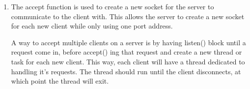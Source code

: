 \documentclass{article}
\begin{document}
\begin{enumerate}
      \item The accept function is used to create a new socket for the server to communicate to the client with. This allows the server to create a new socket for each new client while only using one port address.

            A way to accept multiple clients on a server is by having listen() block until a request come in, before accept() ing that request and create a new thread or task for each new client. This way, each client will have a thread dedicated to handling it's requests. The thread should run until the client disconnects, at which point the thread will exit.

\end{enumerate}
\end{document}
